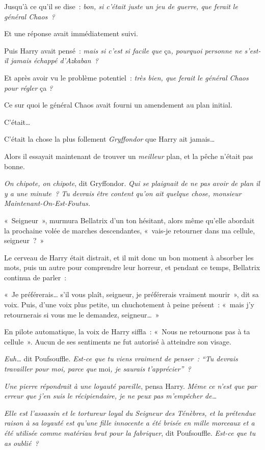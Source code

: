 Jusqu'à ce qu'il se dise~: \emph{bon, si c'était juste un jeu de guerre, que ferait le général Chaos~?}

Et une réponse avait immédiatement suivi.

Puis Harry avait pensé~: \emph{mais si c'est si facile que} ça\emph{, pourquoi personne ne s'est-il jamais échappé d'Azkaban~?}

Et après avoir vu le problème potentiel~: \emph{très bien, que ferait le général Chaos pour régler} ça \emph{?}

Ce sur quoi le général Chaos avait fourni un amendement au plan initial.

C'était…

C'était la chose la plus follement \emph{Gryffondor} que Harry ait jamais…

Alors il essayait maintenant de trouver un \emph{meilleur} plan, et la pêche n'était pas bonne.

\emph{On chipote, on chipote}, dit Gryffondor.
\emph{Qui se plaignait de ne pas avoir de plan il y a une minute~?
Tu devrais être content qu'on ait quelque chose, monsieur Maintenant-On-Est-Foutus.}

«~Seigneur~», murmura Bellatrix d'un ton hésitant, alors même qu'elle abordait la prochaine volée de marches descendantes, «~vais-je retourner dans ma cellule, seigneur~?~»

Le cerveau de Harry était distrait, et il mit donc un bon moment à absorber les mots, puis un autre pour comprendre leur horreur, et pendant ce temps, Bellatrix continua de parler~:

«~Je préférerais… s'il vous plaît, seigneur, je préférerais vraiment mourir~», dit sa voix.
Puis, d'une voix plus petite, un chuchotement à peine présent~: «~mais j'y retournerais si vous me le demandez, seigneur…~»

En pilote automatique, la voix de Harry siffla~: «~Nous ne retournons pas à ta cellule~».
Aucun de ses sentiments ne fut autorisé à atteindre son visage.

\emph{Euh…} dit Poufsouffle.
\emph{Est-ce que tu viens vraiment de penser~: “Tu devrais travailler pour moi, parce que} moi\emph{, je saurais t'apprécier”~?}

\emph{Une pierre répondrait à une loyauté pareille}, pensa Harry.
\emph{Même ce n'est que par erreur que j'en suis le récipiendaire, je ne peux pas m'empêcher de…}

\emph{Elle est l'assassin et le tortureur loyal du Seigneur des Ténèbres, et la prétendue raison à sa loyauté est qu'une fille innocente a été brisée en mille morceaux et a été utilisée comme matériau brut pour la fabriquer}, dit Poufsouffle.
\emph{Est-ce que tu as oublié~?}


